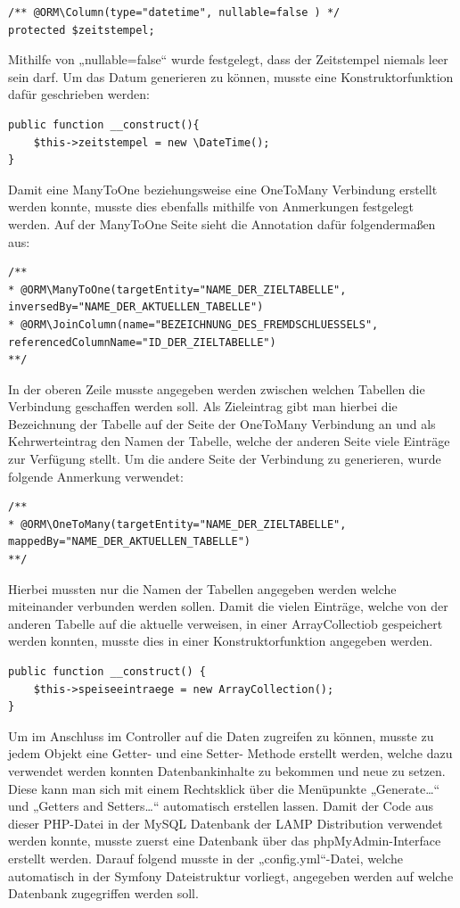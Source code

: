 	\lstset{language=php}
  	\begin{lstlisting}
/** @ORM\Column(type="datetime", nullable=false ) */
protected $zeitstempel;
  	\end{lstlisting}
Mithilfe von „nullable=false“ wurde festgelegt, dass der Zeitstempel niemals leer sein darf.
Um das Datum generieren zu können, musste eine Konstruktorfunktion dafür geschrieben werden:
	
	\lstset{language=php}
  	\begin{lstlisting}
public function __construct(){
	$this->zeitstempel = new \DateTime();
}
\end{lstlisting}
Damit eine ManyToOne beziehungsweise eine OneToMany Verbindung erstellt werden konnte, musste dies ebenfalls mithilfe von Anmerkungen festgelegt werden.
Auf der ManyToOne Seite sieht die Annotation dafür folgendermaßen aus:
	
	\lstset{language=php}
  	\begin{lstlisting}
/**
* @ORM\ManyToOne(targetEntity="NAME_DER_ZIELTABELLE", 
inversedBy="NAME_DER_AKTUELLEN_TABELLE")
* @ORM\JoinColumn(name="BEZEICHNUNG_DES_FREMDSCHLUESSELS", 
referencedColumnName="ID_DER_ZIELTABELLE")
**/
  	\end{lstlisting}
In der oberen Zeile musste angegeben werden zwischen welchen Tabellen die Verbindung geschaffen werden soll. Als Zieleintrag gibt man hierbei die Bezeichnung der Tabelle auf der Seite der OneToMany Verbindung an und als Kehrwerteintrag den Namen der Tabelle, welche der anderen Seite viele Einträge zur Verfügung stellt.
Um die andere Seite der Verbindung zu generieren, wurde folgende Anmerkung verwendet:
	
	\lstset{language=php}
  	\begin{lstlisting}
/**
* @ORM\OneToMany(targetEntity="NAME_DER_ZIELTABELLE", 
mappedBy="NAME_DER_AKTUELLEN_TABELLE")
**/
  	\end{lstlisting}
Hierbei mussten nur die Namen der Tabellen angegeben werden welche miteinander verbunden werden sollen. Damit die vielen Einträge, welche von der anderen Tabelle auf die aktuelle verweisen, in einer ArrayCollectiob gespeichert werden konnten, musste dies in einer Konstruktorfunktion angegeben werden.
	
	\lstset{language=php}
  	\begin{lstlisting}
public function __construct() {
	$this->speiseeintraege = new ArrayCollection();
}
  	\end{lstlisting}
Um im Anschluss im Controller auf die Daten zugreifen zu können, musste zu jedem Objekt eine Getter- und eine Setter- Methode erstellt werden, welche dazu verwendet werden konnten Datenbankinhalte zu bekommen und neue zu setzen. Diese kann man sich mit einem Rechtsklick über die Menüpunkte „Generate…“ und „Getters and Setters…“ automatisch erstellen lassen.
Damit der Code aus dieser PHP-Datei in der MySQL Datenbank der LAMP Distribution verwendet werden konnte, musste zuerst eine Datenbank über das phpMyAdmin-Interface erstellt werden. Darauf folgend musste in der „config.yml“-Datei, welche automatisch in der Symfony Dateistruktur vorliegt, angegeben werden auf welche Datenbank zugegriffen werden soll.
	

